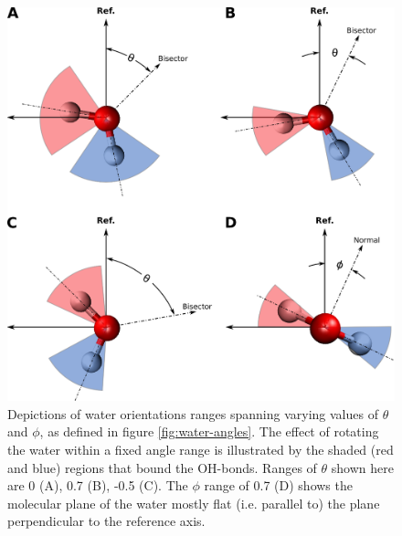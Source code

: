 \begin{figure}[h!]
\begin{center}
	\includegraphics[scale=1.0]{images/h2o-angle-ranges.png}
	\caption{Depictions of water orientations ranges spanning varying values of $\theta$ and $\phi$, as defined in figure \ref{fig:water-angles}. The effect of rotating the water within a fixed angle range is illustrated by the shaded (red and blue) regions that bound the OH-bonds. Ranges of $\theta$ shown here are 0 (A), 0.7 (B), -0.5 (C). The $\phi$ range of 0.7 (D) shows the molecular plane of the water mostly flat (i.e. parallel to) the plane perpendicular to the reference axis.}
	\label{fig:angle-ranges}
\end{center}
\end{figure}

